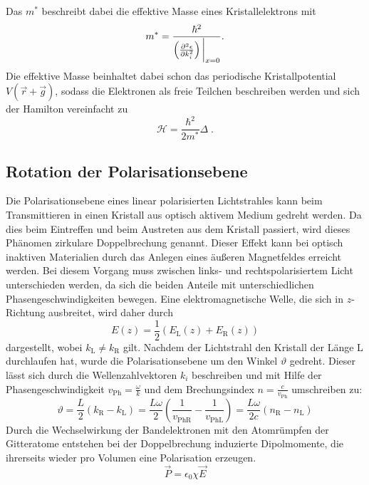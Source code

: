 Das $m^*$ beschreibt dabei die effektive Masse eines Kristallelektrons mit
\begin{equation}
m^* = \frac{\hbar^2}{\left(\frac{\partial^2 \epsilon}{\partial k_i^2}\right)\bigg{\vert}_{x=0}}.
\end{equation}
Die effektive Masse beinhaltet dabei schon das periodische Kristallpotential $V(\vec{r}+\vec{g})$, sodass die Elektronen als
freie Teilchen beschreiben werden und sich der Hamilton vereinfacht zu
\begin{equation*}
  \mathscr{H} = \frac{\hbar^2}{2m^*}\Delta\;.
\end{equation*}

\subsection{Rotation der Polarisationsebene}
Die Polarisationsebene eines linear polarisierten Lichtstrahles kann beim Transmittieren in einen Kristall aus optisch aktivem Medium gedreht
werden. Da dies beim Eintreffen und beim Austreten aus dem Kristall passiert, wird dieses Phänomen zirkulare Doppelbrechung genannt. Dieser
Effekt kann bei optisch inaktiven Materialien durch das Anlegen eines äußeren Magnetfeldes erreicht werden.
Bei diesem Vorgang muss zwischen links- und rechtspolarisiertem Licht unterschieden werden, da sich die beiden Anteile mit unterschiedlichen
Phasengeschwindigkeiten bewegen. Eine elektromagnetische Welle, die sich in $z$-Richtung ausbreitet, wird daher durch
\begin{equation}
  E(z) = \frac{1}{2}(E_\text{L}(z) + E_\text{R}(z))
\end{equation}
dargestellt, wobei $k_\text{L} \neq k_\text{R}$ gilt.
Nachdem der Lichtstrahl den Kristall der Länge L durchlaufen hat, wurde die Polarisationsebene um den Winkel $\vartheta$ gedreht. Dieser
lässt sich durch die Wellenzahlvektoren $k_i$ beschreiben und mit Hilfe der Phasengeschwindigkeit $v_\text{Ph} = \frac{\omega}{k}$ und dem Brechungsindex
$n = \frac{c}{v_\text{Ph}}$ umschreiben zu:
\begin{equation}
  \vartheta = \frac{L}{2}(k_\text{R} - k_\text{L}) = \frac{L\omega}{2}(\frac{1}{v_\text{PhR}} - \frac{1}{v_\text{PhL}}) = \frac{L\omega}{2c}(n_\text{R} - n_\text{L})
\end{equation}
Durch die Wechselwirkung der Bandelektronen mit den Atomrümpfen der Gitteratome entstehen bei der Doppelbrechung induzierte Dipolmomente,
die ihrerseits wieder pro Volumen eine Polarisation erzeugen.
\begin{equation}
  \vec{P} = \epsilon_0\chi\vec{E}
\end{equation}
